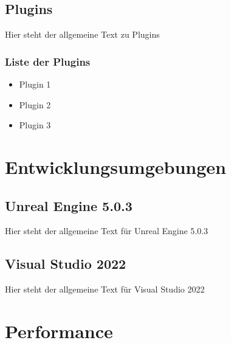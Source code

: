 \subsection{Plugins}
Hier steht der allgemeine Text zu Plugins

\subsubsection{Liste der Plugins}
\begin{itemize}
    \item Plugin 1
    \item Plugin 2
    \item Plugin 3
\end{itemize}

\section{Entwicklungsumgebungen}
\subsection{Unreal Engine 5.0.3}
Hier steht der allgemeine Text für Unreal Engine 5.0.3

\subsection{Visual Studio 2022}
Hier steht der allgemeine Text für Visual Studio 2022

\section{Performance}